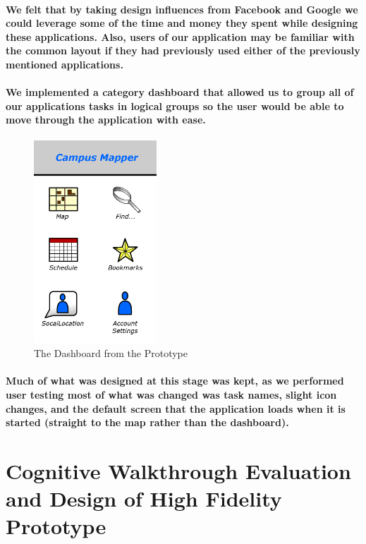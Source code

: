 \documentclass{report}
\begin{document}
    \paragraph{We felt that by taking design influences from Facebook and Google
    we could leverage some of the time and money they spent while designing these
    applications. Also, users of our application may be familiar with the common
    layout if they had previously used either of the previously mentioned
    applications.}
    \paragraph{We implemented a category dashboard that allowed us to group all
    of our applications tasks in logical groups so the user would be able to move
    through the application with ease.}
    \begin{figure}
        \centering
            \includegraphics[height=3in]{img/figure433.png}
        \caption{The Dashboard from the Prototype}
    \end{figure}
    \paragraph{Much of what was designed at this stage was kept, as we performed
    user testing most of what was changed was task names, slight icon changes, and
    the default screen that the application loads when it is started (straight to
    the map rather than the dashboard).}
\section{Cognitive Walkthrough Evaluation and Design of High Fidelity
Prototype}
\end{document}
